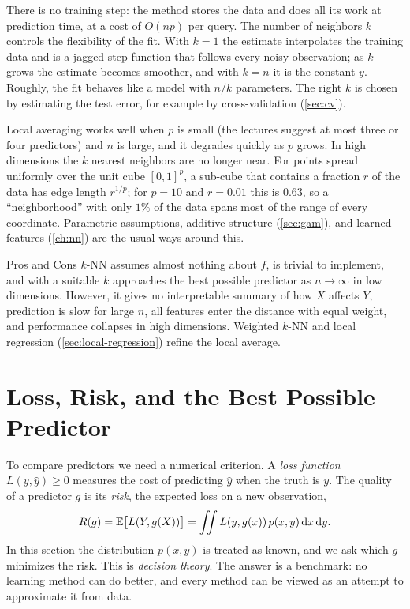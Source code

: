There is no training step: the method stores the data and does all its work at prediction time, at a cost of $O(np)$ per query. The number of neighbors $k$ controls the flexibility of the fit. With $k=1$ the estimate interpolates the training data and is a jagged step function that follows every noisy observation; as $k$ grows the estimate becomes smoother, and with $k=n$ it is the constant $\bar y$. Roughly, the fit behaves like a model with $n/k$ parameters. The right $k$ is chosen by estimating the test error, for example by cross-validation (\cref{sec:cv}).

\begin{remark}\label{rem:curse}
Local averaging works well when $p$ is small (the lectures suggest at most three or four predictors) and $n$ is large, and it degrades quickly as $p$ grows. In high dimensions the $k$ nearest neighbors are no longer near. For points spread uniformly over the unit cube $[0,1]^p$, a sub-cube that contains a fraction $r$ of the data has edge length $r^{1/p}$; for $p=10$ and $r=0.01$ this is $0.63$, so a ``neighborhood'' with only $1\%$ of the data spans most of the range of every coordinate. Parametric assumptions, additive structure (\cref{sec:gam}), and learned features (\cref{ch:nn}) are the usual ways around this.
\end{remark}

\begin{notebox}{Pros and Cons}
$k$-NN assumes almost nothing about $f$, is trivial to implement, and with a suitable $k$ approaches the best possible predictor as $n\to\infty$ in low dimensions. However, it gives no interpretable summary of how $X$ affects $Y$, prediction is slow for large $n$, all features enter the distance with equal weight, and performance collapses in high dimensions. Weighted $k$-NN and local regression (\cref{sec:local-regression}) refine the local average.
\end{notebox}

\section{Loss, Risk, and the Best Possible Predictor}\label{sec:decision-theory}

To compare predictors we need a numerical criterion. A \emph{loss function} $L(y,\hat y)\ge0$ measures the cost of predicting $\hat y$ when the truth is $y$. The quality of a predictor $g$ is its \emph{risk}, the expected loss on a new observation,
\[
R(g)=\mathbb{E}\big[L(Y,g(X))\big]=\iint L(y,g(x))\,p(x,y)\,\mathrm{d} x\,\mathrm{d} y.
\]
In this section the distribution $p(x,y)$ is treated as known, and we ask which $g$ minimizes the risk. This is \emph{decision theory}. The answer is a benchmark: no learning method can do better, and every method can be viewed as an attempt to approximate it from data.

